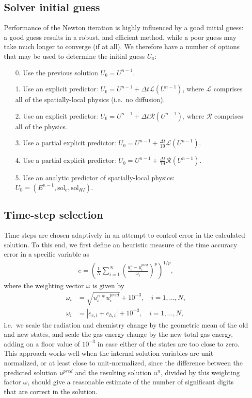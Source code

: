 \documentclass[letterpaper,10pt]{article}
\renewcommand{\(}{\left(}
\renewcommand{\)}{\right)}
\newcommand{\dt}{\Delta t}
\begin{document}
\subsection{Solver initial guess}
\label{sec:initial_guess}

Performance of the Newton iteration is highly influenced by a good
initial guess: a good guess results in a robust, and efficient method,
while a poor guess may take much longer to converge (if at all).  We
therefore have a number of options that may be used to determine the
initial guess $U_0$:
\begin{itemize}
\item[0.] Use the previous solution 
  $U_0 = U^{n-1}$.
\item[1.] Use an explicit predictor: $U_0 = U^{n-1} + \dt
  \mathcal L(U^{n-1})$, where $\mathcal L$ comprises all of the
  spatially-local physics (i.e.~no diffusion).
\item[2.] Use an explicit predictor: $U_0 = U^{n-1} + \dt
  \mathcal R(U^{n-1})$, where $\mathcal R$ comprises all of the
  physics.
\item[3.] Use a partial explicit predictor: $U_0 = U^{n-1} + \frac{\dt}{10}
  \mathcal L(U^{n-1})$.
\item[4.] Use a partial explicit predictor: $U_0 = U^{n-1} + \frac{\dt}{10}
  \mathcal R(U^{n-1})$.
\item[5.] Use an analytic predictor of spatially-local physics: $U_0
  = (E^{n-1},\text{sol}_e,\text{sol}_{HI})$. 
\end{itemize}

\subsection{Time-step selection}
\label{sec:dt_selection}

Time steps are chosen adaptively in an attempt to control error in the
calculated solution.  To this end, we first define an heuristic
measure of the time accuracy error in a specific variable as
\begin{align}
\label{eq:time_error}
  e = \left(\frac1N \sum_{i=1}^N
    \left(\frac{u_i^{n}-u_i^{pred}}{\omega_i}\right)^p\right)^{1/p}, 
\end{align}
where the weighting vector $\omega$ is given by
\begin{align}
\label{eq:time_weighting}
  \omega_i &= \sqrt{u_i^n*u_i^{pred}} + 10^{-3}, \quad i=1,\ldots,N, \\
  \omega_i &= |e_{c,i} + e_{h,i}| + 10^{-3}, \quad i=1,\ldots,N,
\end{align}
i.e.~we scale the radiation and chemistry change by the geometric mean
of the old and new states, and scale the gas energy change by the new
total gas energy, adding on a floor value of $10^{-3}$ in case either
of the states are too close to zero.  This approach works well when
the internal solution variables are unit-normalized, or at least close
to unit-normalized, since the difference between the predicted
solution $u^{pred}$ and the resulting solution $u^n$, divided by this
weighting factor $\omega$, should give a reasonable estimate of the
number of significant digits that are correct in the solution.
\end{document}
